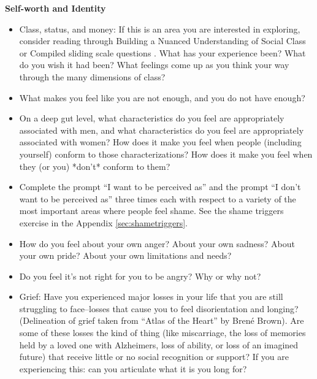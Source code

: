 \documentclass[12pt,letterpaper]{article}
\begin{document}
\noindent \textbf{Self-worth and Identity}
\begin{itemize}
    \item Class, status, and money: If this is an area you are interested in exploring, consider reading through Building a Nuanced Understanding of Social Class or Compiled sliding scale questions . What has your experience been? What do you wish it had been? What feelings come up as you think your way through the many dimensions of class?
    \item  What makes you feel like you are not enough, and you do not have enough?
    \item  On a deep gut level, what characteristics do you feel are appropriately associated with men, and what characteristics do you feel are appropriately associated with women? How does it make you feel when people (including yourself) conform to those characterizations? How does it make you feel when they (or you) *don't* conform to them?
    \item  Complete the prompt “I want to be perceived as” and the prompt “I don't want to be perceived as” three times each with respect to a variety of the most important areas where people feel shame. See the shame triggers exercise in the Appendix \ref{sec:shametriggers}.
    \item  How do you feel about your own anger? About your own sadness? About your own pride? About your own limitations and needs?
    \item  Do you feel it's not right for you to be angry? Why or why not?
    \item  Grief: Have you experienced major losses in your life that you are still struggling to face--losses that cause you to feel disorientation and longing? (Delineation of grief taken from “Atlas of the Heart” by Brené Brown). Are some of these losses the kind of thing (like miscarriage, the loss of memories held by a loved one with Alzheimers, loss of ability, or loss of an imagined future) that receive little or no social recognition or support? If you are experiencing this: can you articulate what it is you long for?
\end{itemize}
\end{document}
